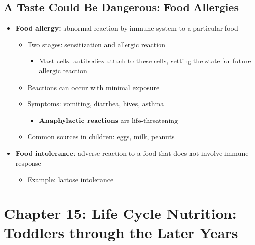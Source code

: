 \documentclass[12pt]{article}
\begin{document}
        \subsection{A Taste Could Be Dangerous: Food Allergies}
            \begin{itemize}
                \item \textbf{Food allergy:} abnormal reaction by immune system to a particular food
                    \begin{itemize}
                        \item Two stages: sensitization and allergic reaction
                            \begin{itemize}
                                \item Mast cells: antibodies attach to these cells, setting the state for future allergic reaction
                            \end{itemize}
                        \item Reactions can occur with minimal exposure
                        \item Symptoms: vomiting, diarrhea, hives, asthma
                            \begin{itemize}
                                \item \textbf{Anaphylactic reactions} are life-threatening
                            \end{itemize}
                        \item Common sources in children: eggs, milk, peanuts
                    \end{itemize}
                \item \textbf{Food intolerance:} adverse reaction to a food that does not involve immune response
                    \begin{itemize}
                        \item Example: lactose intolerance
                    \end{itemize}
            \end{itemize}

    \section{Chapter 15: Life Cycle Nutrition: Toddlers through the Later Years}
\end{document}
